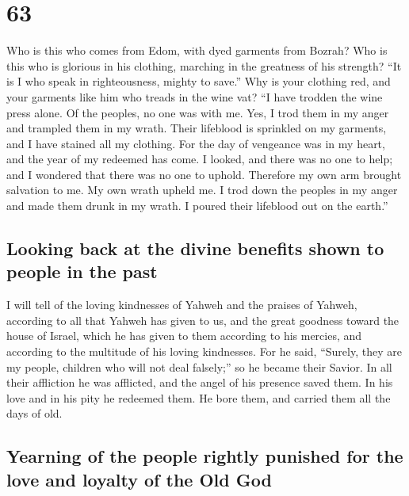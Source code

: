 \hypertarget{section-62}{%
\section{63}\label{section-62}}

 Who is this who comes from Edom, with dyed garments from
Bozrah? Who is this who is glorious in his clothing, marching in the
greatness of his strength? ``It is I who speak in righteousness, mighty
to save.''  Why is your clothing red, and your garments
like him who treads in the wine vat?  ``I have trodden the
wine press alone. Of the peoples, no one was with me. Yes, I trod them
in my anger and trampled them in my wrath. Their lifeblood is sprinkled
on my garments, and I have stained all my clothing.  For
the day of vengeance was in my heart, and the year of my redeemed has
come.  I looked, and there was no one to help; and I
wondered that there was no one to uphold. Therefore my own arm brought
salvation to me. My own wrath upheld me.  I trod down the
peoples in my anger and made them drunk in my wrath. I poured their
lifeblood out on the earth.''

\hypertarget{looking-back-at-the-divine-benefits-shown-to-people-in-the-past}{%
\subsection{Looking back at the divine benefits shown to people in the
past}\label{looking-back-at-the-divine-benefits-shown-to-people-in-the-past}}

 I will tell of the loving kindnesses of Yahweh and the
praises of Yahweh, according to all that Yahweh has given to us, and the
great goodness toward the house of Israel, which he has given to them
according to his mercies, and according to the multitude of his loving
kindnesses.  For he said, ``Surely, they are my people,
children who will not deal falsely;'' so he became their Savior.
 In all their affliction he was afflicted, and the angel
of his presence saved them. In his love and in his pity he redeemed
them. He bore them, and carried them all the days of old.

\hypertarget{yearning-of-the-people-rightly-punished-for-the-love-and-loyalty-of-the-old-god}{%
\subsection{Yearning of the people rightly punished for the love and
loyalty of the Old
God}\label{yearning-of-the-people-rightly-punished-for-the-love-and-loyalty-of-the-old-god}}

